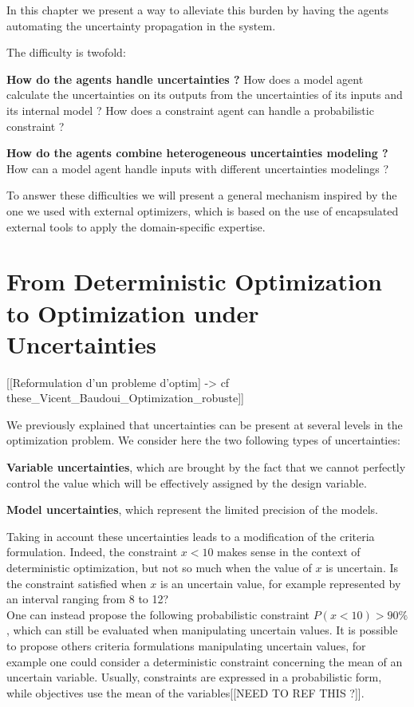 In this chapter we present a way to alleviate this burden by having the agents automating the uncertainty propagation in the system.

The difficulty is twofold:
\begin{compactitem}
\item \textbf{How do the agents handle uncertainties ?}
How does a model agent calculate the uncertainties on its outputs from the uncertainties of its inputs and its internal model ? How does a constraint agent can handle a probabilistic constraint ?

\item \textbf{How do the agents combine heterogeneous uncertainties modeling ?}
How can a model agent handle inputs with different uncertainties modelings ?
\end{compactitem}

To answer these difficulties we will present a general mechanism inspired by the one we used with external optimizers, which is based on the use of encapsulated external tools to apply the domain-specific expertise.

\section{From Deterministic Optimization to Optimization under Uncertainties}

[[Reformulation d'un probleme d'optim] -> cf these_Vicent_Baudoui_Optimization_robuste]]

We previously explained that uncertainties can be present at several levels in the optimization problem. We consider here the two following types of uncertainties:
\begin{compactitem}
\item \textbf{Variable uncertainties}, which are brought by the fact that we cannot perfectly control the value which will be effectively assigned by the design variable.
\item \textbf{Model uncertainties}, which represent the limited precision of the models.
\end{compactitem}

Taking in account these uncertainties leads to a modification of the criteria formulation. Indeed, the constraint $x < 10$ makes sense in the context of deterministic optimization, but not so much when the value of $x$ is uncertain. Is the constraint satisfied when $x$ is an uncertain value, for example represented by an interval ranging from 8 to 12?\\
One can instead propose the following probabilistic constraint $P(x < 10) > 90\%$, which can still be evaluated when manipulating uncertain values. It is possible to propose others criteria formulations manipulating uncertain values, for example one could consider a deterministic constraint concerning the mean of an uncertain variable. Usually, constraints are expressed in a probabilistic form, while objectives use the mean of the variables[[NEED TO REF THIS ?]].

